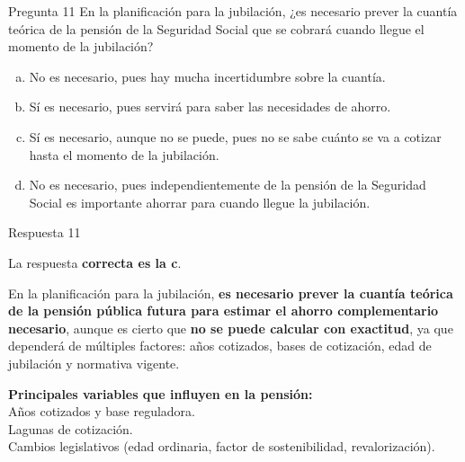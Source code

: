 \documentclass[
  ignorenonframetext,
  aspectratio=54,
  spanish,
]{beamer}
\providecommand{\tightlist}{%
  \setlength{\itemsep}{0pt}\setlength{\parskip}{0pt}}
\begin{document}
\begin{frame}{Pregunta 11}
\label{pregunta-11}
En la planificación para la jubilación, ¿es necesario prever la cuantía
teórica de la pensión de la Seguridad Social que se cobrará cuando
llegue el momento de la jubilación?

\begin{enumerate}
[a.]
\tightlist
\item
  No es necesario, pues hay mucha incertidumbre sobre la cuantía.\\
\item
  Sí es necesario, pues servirá para saber las necesidades de ahorro.\\
\item
  Sí es necesario, aunque no se puede, pues no se sabe cuánto se va a
  cotizar hasta el momento de la jubilación.\\
\item
  No es necesario, pues independientemente de la pensión de la Seguridad
  Social es importante ahorrar para cuando llegue la jubilación.
\end{enumerate}
\end{frame}

\begin{frame}{Respuesta 11}
\label{respuesta-11}
\begin{tcolorbox}[enhanced jigsaw, rightrule=.15mm, colback=white, arc=.35mm, colframe=quarto-callout-tip-color-frame, leftrule=.75mm, bottomrule=.15mm, left=2mm, toprule=.15mm, opacityback=0, breakable]
\begin{minipage}[t]{5.5mm}
\textcolor{quarto-callout-tip-color}{\faLightbulb}
\end{minipage}%
\begin{minipage}[t]{\textwidth - 5.5mm}

La respuesta \textbf{correcta es la c}.

En la planificación para la jubilación, \textbf{es necesario prever la
cuantía teórica de la pensión pública futura para estimar el ahorro
complementario necesario}, aunque es cierto que \textbf{no se puede
calcular con exactitud}, ya que dependerá de múltiples factores: años
cotizados, bases de cotización, edad de jubilación y normativa vigente.

\textbf{Principales variables que influyen en la pensión:}\\
Años cotizados y base reguladora.\\
Lagunas de cotización.\\
Cambios legislativos (edad ordinaria, factor de sostenibilidad,
revalorización).

\end{minipage}%
\end{tcolorbox}
\end{frame}
\end{document}
